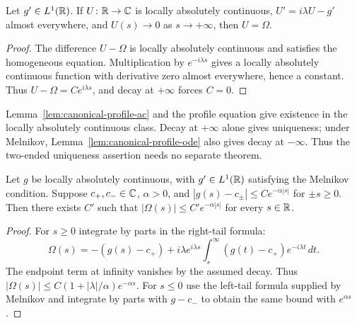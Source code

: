 \begin{lemma}
\label{lem:canonical-profile-unique}
\leanok
Let $g'\in L^1(\mathbb{R})$. If $U\colon\mathbb{R}\to\mathbb{C}$ is locally absolutely continuous,
$U'=i\lambda U-g'$ almost everywhere, and $U(s)\to0$ as $s\to+\infty$,
then $U=\Omega$.
\end{lemma}

\begin{proof}
\leanok
The difference $U-\Omega$ is locally absolutely continuous and satisfies the
homogeneous equation. Multiplication by $e^{-i\lambda s}$ gives a locally
absolutely continuous function with derivative zero almost everywhere, hence a
constant. Thus $U-\Omega=Ce^{i\lambda s}$, and decay at $+\infty$ forces $C=0$.
\end{proof}

\begin{remark}
Lemma~\ref{lem:canonical-profile-ac} and the profile equation give existence in
the locally absolutely continuous class. Decay at $+\infty$ alone gives uniqueness;
under Melnikov, Lemma~\ref{lem:canonical-profile-ode} also gives decay at $-\infty$.
Thus the two-ended uniqueness assertion needs no separate theorem.
\end{remark}

\begin{lemma}
\label{lem:canonical-profile-decay}
\leanok
Let $g$ be locally absolutely continuous, with $g'\in L^1(\mathbb{R})$ satisfying the
Melnikov condition. Suppose $c_+,c_-\in\mathbb{C}$, $\alpha>0$, and
$|g(s)-c_\pm|\le Ce^{-\alpha|s|}$ for $\pm s\ge0$.
Then there exists $C'$ such that $|\Omega(s)|\le C'e^{-\alpha|s|}$ for every $s\in\mathbb{R}$.
\end{lemma}

\begin{proof}
\leanok
For $s\ge0$ integrate by parts in the right-tail formula:
\[
  \Omega(s)=-(g(s)-c_+)
    +i\lambda e^{i\lambda s}\int_s^\infty(g(t)-c_+)e^{-i\lambda t}\,dt.
\]
The endpoint term at infinity vanishes by the assumed decay. Thus
$|\Omega(s)|\le C(1+|\lambda|/\alpha)e^{-\alpha s}$.
For $s\le0$ use the left-tail formula supplied by Melnikov and integrate by
parts with $g-c_-$ to obtain the same bound with $e^{\alpha s}$.
\end{proof}

